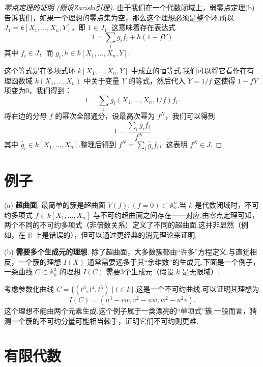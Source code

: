 \begin{proof}[零点定理的证明 (假设Zariski引理)]
由于我们在一个代数闭域上，弱零点定理(b)告诉我们，如果一个理想的零点集为空，那么这个理想必须是整个环.所以 \(J_1 = k\left\lbrack  {{X}_{1},\ldots ,{X}_{n},Y}\right\rbrack\)，即 \(1 \in J_1\).
这意味着存在表达式
\[
1 = \sum_{i} g_i f_i + h(1-fY)
\]
其中 \({f}_{i} \in  J\)，而 \({g}_{i}, h \in  k\left\lbrack  {{X}_{1},\ldots ,{X}_{n},Y}\right\rbrack\).

这个等式是在多项式环 \(k\left\lbrack  {{X}_{1},\ldots ,{X}_{n},Y}\right\rbrack\) 中成立的恒等式.我们可以将它看作在有理函数域 \(k(X_1, \ldots, X_n)\) 中关于变量 \(Y\) 的等式，然后代入 \(Y = 1/f\).这使得 \(1-fY\) 项变为0，我们得到：
\[
1 = \sum_{i} g_i(X_1, \ldots, X_n, 1/f) f_i.
\]
将右边的分母 \(f\) 的幂次全部通分，设最高次幂为 \(f^N\)，我们可以得到
\[
1 = \frac{\sum_i \tilde{g_i} f_i}{f^N}
\]
其中 \(\tilde{g_i} \in k[X_1, \ldots, X_n]\).整理后得到 \({f}^{N} = \sum_i \tilde{g_i} f_i\)，这表明 \({f}^{N} \in  J\).
\end{proof}

\section{例子}

(a) \textbf{超曲面}. 最简单的簇是超曲面 \(V\left( f\right)  : \left( {f = 0}\right)  \subset  {\mathbb{A}}_{k}^{n}\).当 \(k\) 是代数闭域时，不可约多项式 \(f \in  k\left\lbrack  {{X}_{1},\ldots ,{X}_{n}}\right\rbrack\) 与不可约超曲面之间存在一一对应.由零点定理可知，两个不同的不可约多项式（非倍数关系）定义了不同的超曲面.这并非显然（例如，在 \(\mathbb{R}\) 上是错误的），但可以通过更经典的消元理论来证明.

(b) \textbf{需要多个生成元的理想}. 除了超曲面，大多数簇都由“许多”方程定义.与直觉相反，一个簇的理想 \(I\left( X\right)\) 通常需要远多于其“余维数”的生成元.下面是一个例子，一条曲线 \(C \subset  {\mathbb{A}}_{k}^{3}\) 的理想 \(I\left( C\right)\) 需要3个生成元（假设 \(k\) 是无限域）.

考虑参数化曲线 \(C = \{ (t^3, t^4, t^5) \mid t \in k \}\).这是一个不可约曲线.可以证明其理想为
\[ I(C) = (u^3-vw, v^2-uw, w^2-u^2v). \]
这个理想不能由两个元素生成.这个例子属于一类漂亮的“单项式”簇.一般而言，猜测一个簇的不可约分量可能相当棘手，证明它们不可约则更难.

\section{有限代数}

